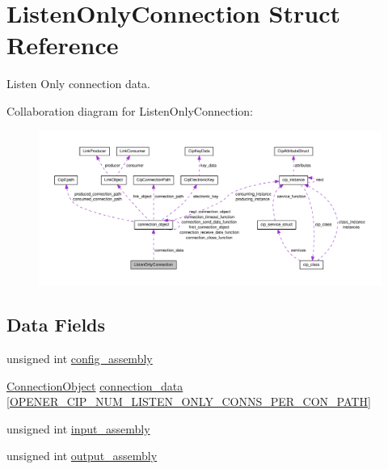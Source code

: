 \hypertarget{structListenOnlyConnection}{\section{\-Listen\-Only\-Connection \-Struct \-Reference}
\label{d3/d01/structListenOnlyConnection}
}


\-Listen \-Only connection data.  




\-Collaboration diagram for \-Listen\-Only\-Connection\-:
\nopagebreak
\begin{figure}[H]
\begin{center}
\leavevmode
\includegraphics[width=350pt]{df/dde/structListenOnlyConnection__coll__graph}
\end{center}
\end{figure}
\subsection*{\-Data \-Fields}
\begin{DoxyCompactItemize}
\item 
unsigned int \hyperlink{structListenOnlyConnection_a24a9027536ff98fdd4b6988e51ba1dc5}{config\-\_\-assembly}
\item 
\hyperlink{cipconnectionmanager_8h_a705e78f4613ecabcb6388951b73c4700}{\-Connection\-Object} \hyperlink{structListenOnlyConnection_ad104ff3792984bca1ae96d08c5c4cb43}{connection\-\_\-data} \mbox{[}\hyperlink{WIN32_2sample__application_2opener__user__conf_8h_ab12e108ce020a5b3d2437475a2b0b96b}{\-O\-P\-E\-N\-E\-R\-\_\-\-C\-I\-P\-\_\-\-N\-U\-M\-\_\-\-L\-I\-S\-T\-E\-N\-\_\-\-O\-N\-L\-Y\-\_\-\-C\-O\-N\-N\-S\-\_\-\-P\-E\-R\-\_\-\-C\-O\-N\-\_\-\-P\-A\-T\-H}\mbox{]}
\item 
unsigned int \hyperlink{structListenOnlyConnection_a0487168c1664b9849d15c00d5e730418}{input\-\_\-assembly}
\item 
unsigned int \hyperlink{structListenOnlyConnection_afedc3eb3f436950bb83b61078207909b}{output\-\_\-assembly}
\end{DoxyCompactItemize}


